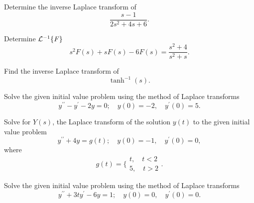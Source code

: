 \documentclass[11pt]{article}
\begin{document}
\makelabtitle


\begin{problem}
Determine the inverse Laplace transform of
\[\frac{s-1}{2s^{2}+4s+6}.\]
\end{problem}

\begin{problem}
Determine ${\cal L}^{-1}\{ {\it F }\}$ 
\begin{equation*}
s^2 F(s) +sF(s)-6F(s) = \dfrac{s^2+4}{s^2+s}.
\end{equation*}
\end{problem}


\begin{problem}
Find the inverse Laplace transform of 
\[\tanh^{-1} (s).\]
\end{problem}

\begin{problem}
Solve the given initial value problem using the method of Laplace transforms
\begin{equation*}
y^{\prime \prime} - y^{\prime}-2y =0 ; \quad y(0)=-2, \quad y^{\prime}(0) = 5.
\end{equation*}
\end{problem}


\begin{problem}
Solve for $Y(s)$, the Laplace transform of the solution $y(t)$ to the given initial value problem
\begin{equation*}
y^{\prime \prime} +4y = g(t) ; \quad y(0)=-1, \quad y^{\prime}(0) = 0,
\end{equation*}
where
\begin{equation*}
g(t) = \bigg\{ \begin{array}{ccc}
t, \quad t<2 \\
5, \quad t>2
\end{array}.
\end{equation*}
\end{problem}

\begin{problem}
Solve the given initial value problem using the method of Laplace transforms
\begin{equation*}
y^{\prime \prime} + 3 t y^{\prime} - 6y = 1 ; \quad y(0)=0, \quad y^{\prime}(0) = 0.
\end{equation*}
\end{problem}
\end{document}
